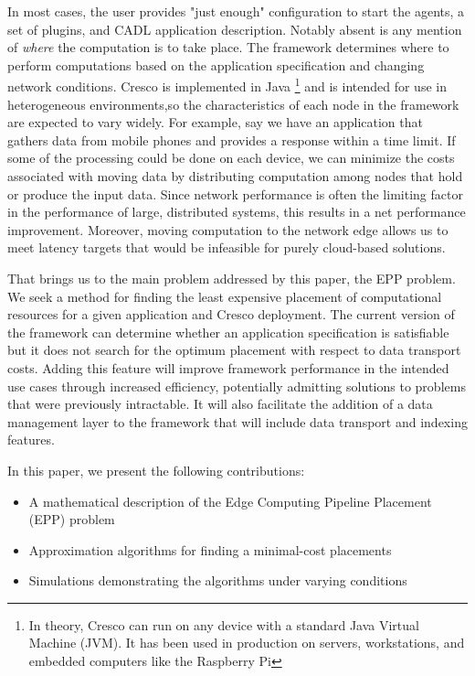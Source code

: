 \documentclass{acmart}
\begin{document}
    In most cases, the user provides "just enough" configuration to start the agents, a set of plugins, and CADL application description. Notably absent is any mention of \textit{where} the computation is to take place. The framework determines where to perform computations based on the application specification and changing network conditions. Cresco is implemented in Java \footnote{In theory, Cresco can run on any device with a standard Java Virtual Machine (JVM). It has been used in production on servers, workstations, and embedded computers like the Raspberry Pi}
    and is intended for use in heterogeneous environments,so the characteristics of each node in the framework are expected to vary widely. For example, say we have an application that gathers data from mobile phones and provides a response within a time limit. If some of the processing could be done on each device, we can minimize the costs associated with moving data by distributing computation among nodes that hold or produce the input data. Since network performance is often the limiting factor in the performance of large, distributed systems, this results in a net performance improvement. Moreover, moving computation to the network edge allows us to meet latency targets that would be infeasible for purely cloud-based solutions.
    
    That brings us to the main problem addressed by this paper, the EPP problem.  We seek a method for finding the least expensive placement of computational resources for a given application and Cresco deployment. The current version of the framework can determine whether an application specification is satisfiable but it does not search for the optimum placement with respect to data transport costs. Adding this feature will improve framework performance in the intended use cases through increased efficiency, potentially admitting solutions to problems that were previously intractable. It will also facilitate the addition of a data management layer to the framework that will include data transport and indexing features.
    
    In this paper, we present the following contributions:
    \begin{itemize}
    	\item A mathematical description of the Edge Computing Pipeline Placement (EPP) problem
    	\item Approximation algorithms for finding a minimal-cost placements
 	    \item Simulations demonstrating the algorithms under varying conditions
    \end{itemize}
    
\end{document}

